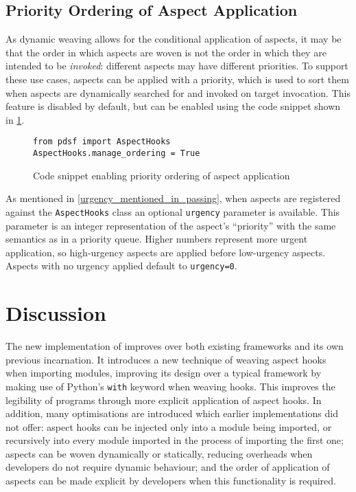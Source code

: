 \subsection{Priority Ordering of Aspect Application}
\label{aspect_priority_support}

As dynamic weaving allows for the conditional application of aspects, it may be
that the order in which aspects are woven is not the order in which they are
intended to be \emph{invoked}: different aspects may have different priorities.
To support these use cases, aspects can be applied with a priority, which is
used to sort them when aspects are dynamically searched for and invoked on
target invocation. This feature is disabled by default, but can be enabled using
the code snippet shown in \cref{fig:enabling_priority_sorting_of_aspects}.

\begin{figure}
    \begin{lstlisting}[]
from pdsf import AspectHooks
AspectHooks.manage_ordering = True
    \end{lstlisting}
    \caption{Code snippet enabling priority ordering of aspect application}
    \label{fig:enabling_priority_sorting_of_aspects}
\end{figure}

As mentioned in \cref{urgency_mentioned_in_passing}, when aspects are registered
against the \lstinline{AspectHooks} class an optional \lstinline{urgency}
parameter is available. This parameter is an integer representation of the
aspect's ``priority'' with the same semantics as in a priority queue. Higher
numbers represent more urgent application, so high-urgency aspects are applied
before low-urgency aspects. Aspects with no urgency applied default to
\lstinline{urgency=0}.


\section{Discussion}

The new implementation of \pdsf{} improves over both existing \aop{} frameworks
and its own previous incarnation. It introduces a new technique of weaving
aspect hooks when importing modules, improving its design over a typical
\aspectorientation{} framework by making use of Python's \lstinline{with}
keyword when weaving hooks. This improves the legibility of \aspectoriented{}
programs through more explicit application of aspect hooks. In addition, many
optimisations are introduced which earlier \pdsf{} implementations did not
offer: aspect hooks can be injected only into a module being imported, or
recursively into every module imported in the process of importing the first
one; aspects can be woven dynamically or statically, reducing overheads when
developers do not require dynamic behaviour; and the order of application of
aspects can be made explicit by developers when this functionality is required.

